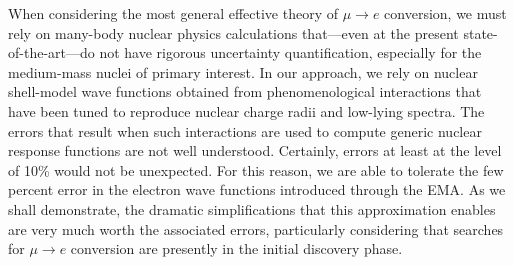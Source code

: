 \documentclass[12pt,letterpaper]{book}
\begin{document}
When considering the most general effective theory of $\mu\rightarrow e$ conversion, we must rely on many-body nuclear physics calculations that---even at the present state-of-the-art---do not have rigorous uncertainty quantification, especially for the medium-mass nuclei of primary interest. In our approach, we rely on nuclear shell-model wave functions obtained from phenomenological interactions that have been tuned to reproduce nuclear charge radii and low-lying spectra. The errors that result when such interactions are used to compute generic nuclear response functions are not well understood. Certainly, errors at least at the level of 10\% would not be unexpected. For this reason, we are able to tolerate the few percent error in the electron wave functions introduced through the EMA. As we shall demonstrate, the dramatic simplifications that this approximation enables are very much worth the associated errors, particularly considering that searches for $\mu\rightarrow e$ conversion are presently in the initial discovery phase.
\end{document}
